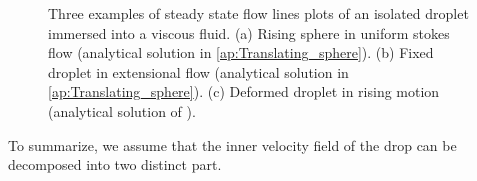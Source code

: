 \begin{figure}
    \centering
    \caption{Three examples of steady state flow lines plots of an isolated droplet immersed into a viscous fluid. 
    (a) Rising sphere in uniform stokes flow (analytical solution in \ref{ap:Translating_sphere}). 
    (b) Fixed droplet in extensional flow (analytical solution in \ref{ap:Translating_sphere}).
    (c) Deformed droplet in rising motion (analytical solution of \citet{taylor1964deformation}). }
    \label{fig:flowlines}
\end{figure}
To summarize, we assume that the inner velocity field of the drop can be decomposed into two distinct part. 
